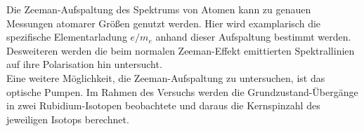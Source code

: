 \documentclass[../main.tex]{subfiles}
\begin{document}
Die Zeeman-Aufspaltung des Spektrums von Atomen kann zu genauen Messungen atomarer Größen genutzt werden. Hier wird examplarisch die spezifische Elementarladung $e/m_e$ anhand dieser Aufspaltung bestimmt werden. Desweiteren werden die beim normalen Zeeman-Effekt emittierten Spektrallinien auf ihre Polarisation hin untersucht.\\

Eine weitere Möglichkeit, die Zeeman-Aufspaltung zu untersuchen, ist das optische Pumpen. Im Rahmen des Versuchs werden die Grundzustand-Übergänge in zwei Rubidium-Isotopen beobachtete und daraus die Kernspinzahl des jeweiligen Isotops berechnet.

\end{document}
